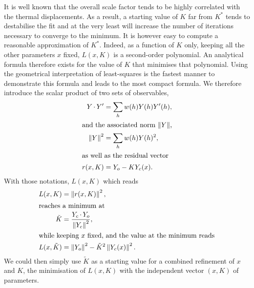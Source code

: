 \documentclass[11pt]{article}
\newcommand{\norm}[1]{\left\| #1 \right\|}
\DeclareMathOperator{\dotprod}{\cdot}
\begin{document}
It is well known that the overall scale factor tends to be highly correlated with the thermal displacements. As a result, a starting value of $K$ far from $K^*$ tends to destabilise the fit and at the very least will increase the number of iterations necessary to converge to the minimum. It is however easy to compute a reasonable approximation of $K^*$. Indeed, as a function of $K$ only, keeping all the other parameters $x$ fixed, $L(x, K)$ is a second-order polynomial. An analytical formula therefore exists for the value of $K$ that minimises that polynomial. Using the geometrical interpretation of least-squares is the fastest manner to demonstrate this formula and leads to the most compact formula. We therefore introduce the scalar product of two sets of observables,
\begin{align}
Y \dotprod Y' &= \sum_h w(h) Y(h) Y'(h), \\
\intertext{and the associated norm $\norm{Y}$,}
\norm{Y}^2 &= \sum_h w(h) Y(h)^2, \\
\intertext{as well as the residual vector}
r(x, K) &= Y_o - K Y_c(x).
\label{eqn:lsresidualdef}
\end{align}
With those notations, $L(x, K)$ which reads
\begin{align}
L(x, K) &= \norm{r(x, K)}^2, \\
\intertext{reaches a minimum at}
\tilde{K} &= \frac{Y_c \dotprod Y_o}{\norm{Y_c}^2},
\label{eqn:tildeK}
\\
\intertext{while keeping $x$ fixed, and the value at the minimum reads}
L(x, \tilde{K}) &= \norm{Y_o}^2 - \tilde{K}^2 \norm{Y_c(x)}^2.
\end{align}
We could then simply use $\tilde{K}$ as a starting value for a combined refinement of $x$ and $K$,  the minimisation of $L(x, K)$ with the independent vector $(x, K)$ of parameters.
\end{document}
